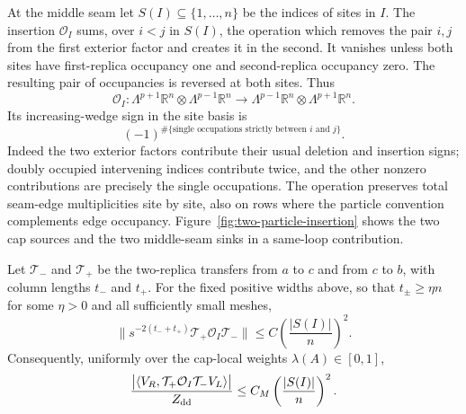 At the middle seam let $S(I)\subseteq\{1,\ldots,n\}$ be the indices of
sites in $I$.  The insertion $\mathcal O_I$ sums, over $i<j$ in $S(I)$,
the operation which removes the pair $i,j$ from the first exterior
factor and creates it in the second.  It vanishes unless both sites
have first-replica occupancy one and second-replica occupancy zero.
The resulting pair of occupancies is reversed at both sites.  Thus
\[
 \mathcal O_I:
 \Lambda^{p+1}\mathbb R^n\otimes\Lambda^{p-1}\mathbb R^n
 \longrightarrow
 \Lambda^{p-1}\mathbb R^n\otimes\Lambda^{p+1}\mathbb R^n.
\]
Its increasing-wedge sign in the site basis is
\begin{equation}
 (-1)^{\#\{\text{single occupations strictly between }i\text{ and }j\}}.
 \label{eq:insertion-parity}
\end{equation}
Indeed the two exterior factors contribute their usual deletion and
insertion signs; doubly occupied intervening indices contribute twice,
and the other nonzero contributions are precisely the single
occupations.  The operation preserves total seam-edge multiplicities
site by site, also on rows where the particle convention complements
edge occupancy.  Figure~\ref{fig:two-particle-insertion} shows the two
cap sources and the two middle-seam sinks in a same-loop contribution.



\begin{lemma}
\label{lem:sandwiched-insertion}
Let $\mathcal T_-$ and $\mathcal T_+$ be the two-replica transfers from
$a$ to $c$ and from $c$ to $b$, with column lengths $t_-$ and $t_+$.
For the fixed positive widths above, so that $t_\pm\ge\eta n$ for some
$\eta>0$ and all sufficiently small meshes,
\begin{equation}
 \bigl\|s^{-2(t_-+t_+)}
       \mathcal T_+\mathcal O_I\mathcal T_-\bigr\|
       \le C\left(\frac{|S(I)|}{n}\right)^2.
 \label{eq:sandwiched-insertion}
\end{equation}
Consequently, uniformly over the cap-local weights $\lambda(A)\in[0,1]$,
\begin{equation}
 \frac{\bigl|\langle V_R,
       \mathcal T_+\mathcal O_I\mathcal T_-V_L\rangle\bigr|}
      {Z_{\rm dd}}
 \le C_M\left(\frac{|S(I)|}{n}\right)^2.
 \label{eq:marked-contraction-bound}
\end{equation}
\end{lemma}

